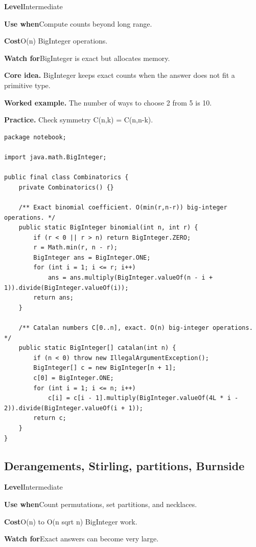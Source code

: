 \documentclass[10pt,letterpaper]{article}
\newcommand{\entrylabel}[1]{\textcolor{accent}{\bfseries #1}}
\begin{document}
\begin{guidebox}\small
\entrylabel{Level}\quad Intermediate\par
\entrylabel{Use when}\quad Compute counts beyond long range.\par
\entrylabel{Cost}\quad O(n) BigInteger operations.\par
\entrylabel{Watch for}\quad BigInteger is exact but allocates memory.\par
\end{guidebox}
\noindent\textbf{Core idea.} BigInteger keeps exact counts when the answer does not fit a primitive type.\par
\noindent\textbf{Worked example.} The number of ways to choose 2 from 5 is 10.\par
\noindent\textbf{Practice.} Check symmetry C(n,k) = C(n,n-k).\par
\begin{lstlisting}
package notebook;

import java.math.BigInteger;

public final class Combinatorics {
    private Combinatorics() {}

    /** Exact binomial coefficient. O(min(r,n-r)) big-integer operations. */
    public static BigInteger binomial(int n, int r) {
        if (r < 0 || r > n) return BigInteger.ZERO;
        r = Math.min(r, n - r);
        BigInteger ans = BigInteger.ONE;
        for (int i = 1; i <= r; i++)
            ans = ans.multiply(BigInteger.valueOf(n - i + 1)).divide(BigInteger.valueOf(i));
        return ans;
    }

    /** Catalan numbers C[0..n], exact. O(n) big-integer operations. */
    public static BigInteger[] catalan(int n) {
        if (n < 0) throw new IllegalArgumentException();
        BigInteger[] c = new BigInteger[n + 1];
        c[0] = BigInteger.ONE;
        for (int i = 1; i <= n; i++)
            c[i] = c[i - 1].multiply(BigInteger.valueOf(4L * i - 2)).divide(BigInteger.valueOf(i + 1));
        return c;
    }
}
\end{lstlisting}
\subsection{Derangements, Stirling, partitions, Burnside}
\begin{guidebox}\small
\entrylabel{Level}\quad Intermediate\par
\entrylabel{Use when}\quad Count permutations, set partitions, and necklaces.\par
\entrylabel{Cost}\quad O(n) to O(n sqrt n) BigInteger work.\par
\entrylabel{Watch for}\quad Exact answers can become very large.\par
\end{guidebox}
\end{document}
